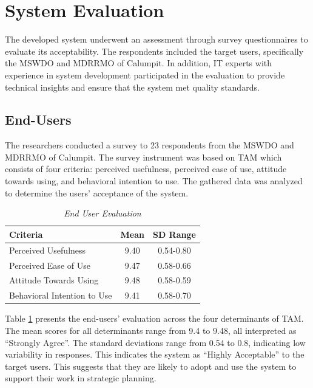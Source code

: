 \section{System Evaluation}
	The developed system underwent an assessment through survey questionnaires to evaluate its acceptability. The respondents included the target users, specifically the MSWDO and MDRRMO of Calumpit. In addition, IT experts with experience in system development participated in the evaluation to provide technical insights and ensure that the system met quality standards.

\subsection{End-Users}
	The researchers conducted a survey to 23 respondents from the MSWDO and MDRRMO of Calumpit. The survey instrument was based on TAM which consists of four criteria: perceived usefulness, perceived ease of use, attitude towards using, and behavioral intention to use. The gathered data was analyzed to determine the users’ acceptance of the system. 

	\begin{table}[h!]
		\centering
		\caption{\textit{End User Evaluation}}
		\label{enduseeval}
		\renewcommand{\arraystretch}{1.3}
			\begin{tabular}{p{5cm}cc}
				\hline
				\textbf{Criteria} & \textbf{Mean} & \textbf{SD Range}  \\
				\hline
				Perceived Usefulness 
				& 9.40 & 0.54-0.80  \\
				Perceived Ease of Use
				& 9.47& 0.58-0.66  \\
				Attitude Towards Using
				& 9.48 & 0.58-0.59  \\
				Behavioral Intention to Use
				& 9.41 & 0.58-0.70  \\
				\hline
			\end{tabular}
		
	\end{table}
	Table \ref{enduseeval} presents the end-users' evaluation across the four determinants of TAM. The mean scores for all determinants range from 9.4 to 9.48, all interpreted as “Strongly Agree”. The standard deviations range from 0.54 to 0.8, indicating low variability in responses. This indicates the system as “Highly Acceptable” to the target users. This suggests that they are likely to adopt and use the system to support their work in strategic planning.
	

